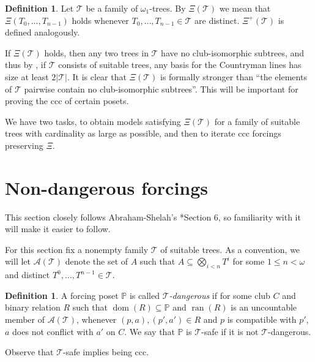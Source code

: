 \documentclass[10pt,a4paper]{amsart}
\theoremstyle{definition}
\newtheorem{definition}[theorem]{Definition}
\renewcommand{\P}{\mathbb {P}}
\newcommand{\seb}{\subseteq}
\newcommand{\1}{\mathbf{1}}
\newcommand{\T}{\mathcal{T}}
\newcommand{\prop}{\Xi}
\newcommand{\propp}{\prop^{+}}
\DeclareMathOperator{\dom}{dom}
\DeclareMathOperator{\ran}{ran}
\begin{document}
\begin{definition}
  Let $\T$ be a family of $\omega_{1}$-trees. By $\prop(\T)$ we mean
  that $\prop(T_{0},\dots,T_{n-1})$ holds whenever $T_{0},\dots,T_{n-1} \in \T$
  are distinct. $\propp(\T)$ is defined analogously.
\end{definition}

If $\prop(\T)$ holds, then any two trees in $\T$ have no club-isomorphic
subtrees, and thus by , if $\T$
consists of suitable trees, any basis for
the Countryman lines has size at least $2|\T|$. It is clear that
$\prop(\T)$ is formally stronger than ``the elements of $\T$ pairwise contain
no club-isomorphic subtrees''. This will be important for
proving the ccc of certain posets.

We have two tasks, to obtain models satisfying $\prop(\T)$ for a family of
suitable trees with cardinality as large as possible, and then
to iterate ccc forcings preserving $\prop$. 



\section{Non-dangerous forcings}\label{sec:non-dangerous}

This section closely follows Abraham-Shelah's \cite{ShelahAbraham}*{Section 6},
so familiarity with it will make it easier to follow.

For this section fix a nonempty family $\T$ of suitable trees.
As a convention, we will let $\mathcal{A}(\T)$
denote the set of $A$ such that $A \seb \bigotimes_{i <
  n}T^{i}$ for some $1 \le n < \omega$ and distinct
$T^{0},\dots,T^{n-1}\in \T$.

\begin{definition}\label{df:safe}
  A forcing poset $\P$ is called
  \emph{$\T$-dangerous} if for some club $C$ and
  binary relation $R$ such that
  $\dom(R) \seb \P$ and $\ran(R)$ is an uncountable
  member of $\mathcal{A}(\T)$,
  whenever $(p,a),(p',a') \in R$ and $p$ is compatible
  with $p'$, $a$ does not conflict with $a'$ on $C$.
  We say that $\P$ is $\T$-safe if it is not $\T$-dangerous.
\end{definition}

Observe that $\T$-safe implies being ccc.
\end{document}

